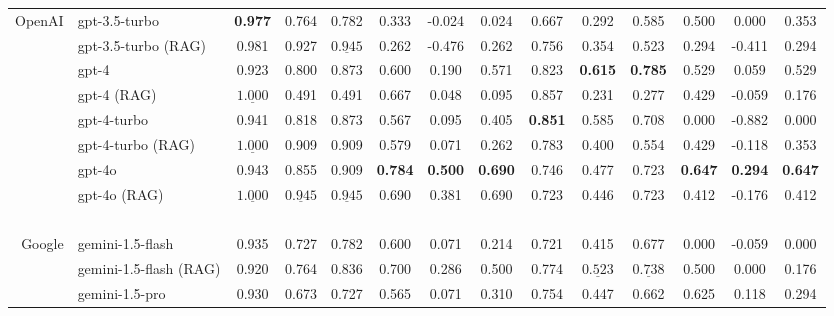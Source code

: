 \begin{table*}[ht]
\begin{tabular}{r|lccc|ccc|ccc|ccc}
        \hline
        OpenAI  & gpt-3.5-turbo          & \textbf{0.977} & 0.764  & 0.782 & 0.333 & -0.024 & 0.024 & 0.667 & 0.292 & 0.585 & 0.500 & 0.000  & 0.353 \\ 
        ~       & gpt-3.5-turbo (RAG)    & 0.981          & 0.927  & $\underline{0.945}$ & 0.262 & -0.476 & 0.262 & 0.756   & 0.354  & 0.523 & 0.294 & -0.411 & 0.294 \\ 
        ~       & gpt-4                  & 0.923 & 0.800  & 0.873 & 0.600 & 0.190  & 0.571 & 0.823 & \textbf{0.615} & \textbf{0.785} & 0.529 & 0.059  & 0.529  \\ 
        ~       & gpt-4 (RAG)            & $\underline{1.000}$ & 0.491  & 0.491 & 0.667 & 0.048  & 0.095 & 0.857 & 0.231 & 0.277 & 0.429 & -0.059 & 0.176 \\ 
        ~       & gpt-4-turbo            & 0.941 & 0.818  & 0.873 & 0.567 & 0.095  & 0.405 & \textbf{0.851} & 0.585 & 0.708 & 0.000 & -0.882 & 0.000  \\
        ~       & gpt-4-turbo (RAG)      & $\underline{1.000}$ & 0.909  & 0.909 & 0.579 & 0.071  & 0.262 & 0.783 & 0.400 & 0.554 & 0.429 & -0.118 & 0.353 \\ 
        ~       & gpt-4o                 & 0.943 & 0.855  & 0.909 & \textbf{0.784} & \textbf{0.500}  & \textbf{0.690} & 0.746 & 0.477 & 0.723 & \textbf{0.647} & \textbf{0.294}  & \textbf{0.647}  \\ 
        ~       & gpt-4o (RAG)           & $\underline{1.000}$  & $\underline{0.945}$ & $\underline{0.945}$ & 0.690 & 0.381 & 0.690 & 0.723 & 0.446 & 0.723 & 0.412 & -0.176 & 0.412   \\ 
        ~       & ~                      & ~ & ~ & ~ & ~  & ~ & ~ & ~ & ~ & ~ & ~  & ~ & ~ \\
        Google  & gemini-1.5-flash       & 0.935 & 0.727  & 0.782 & 0.600 & 0.071  & 0.214 & 0.721 & 0.415 & 0.677 & 0.000 & -0.059 & 0.000\\ 
        ~       & gemini-1.5-flash (RAG) & 0.920 & 0.764 & 0.836  & 0.700  & 0.286 & 0.500 & 0.774 & $\underline{0.523}$ & $\underline{0.738}$ & 0.500 & 0.000 & 0.176 \\ 
        ~       & gemini-1.5-pro         & 0.930 & 0.673  & 0.727 & 0.565 & 0.071  & 0.310 & 0.754 & 0.447 & 0.662 & 0.625 & 0.118  & 0.294\\ 

\end{tabular}
\end{table*}
